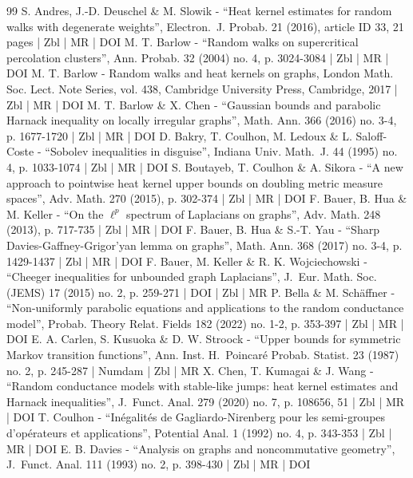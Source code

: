 \begin{thebibliography}{99}
S. Andres, J.-D. Deuschel \& M. Slowik - “Heat kernel estimates for random walks with degenerate weights”, Electron. J. Probab. 21 (2016), article ID 33, 21 pages | Zbl | MR | DOI
M. T. Barlow - “Random walks on supercritical percolation clusters”, Ann. Probab. 32 (2004) no. 4, p. 3024-3084 | Zbl | MR | DOI
M. T. Barlow - Random walks and heat kernels on graphs, London Math. Soc. Lect. Note Series, vol. 438, Cambridge University Press, Cambridge, 2017 | Zbl | MR | DOI
M. T. Barlow \& X. Chen - “Gaussian bounds and parabolic Harnack inequality on locally irregular graphs”, Math. Ann. 366 (2016) no. 3-4, p. 1677-1720 | Zbl | MR | DOI
D. Bakry, T. Coulhon, M. Ledoux \& L. Saloff-Coste - “Sobolev inequalities in disguise”, Indiana Univ. Math. J. 44 (1995) no. 4, p. 1033-1074 | Zbl | MR | DOI
S. Boutayeb, T. Coulhon \& A. Sikora - “A new approach to pointwise heat kernel upper bounds on doubling metric measure spaces”, Adv. Math. 270 (2015), p. 302-374 | Zbl | MR | DOI
F. Bauer, B. Hua \& M. Keller - “On the $\ell ^p$ spectrum of Laplacians on graphs”, Adv. Math. 248 (2013), p. 717-735 | Zbl | MR | DOI
F. Bauer, B. Hua \& S.-T. Yau - “Sharp Davies-Gaffney-Grigor’yan lemma on graphs”, Math. Ann. 368 (2017) no. 3-4, p. 1429-1437 | Zbl | MR | DOI
F. Bauer, M. Keller \& R. K. Wojciechowski - “Cheeger inequalities for unbounded graph Laplacians”, J. Eur. Math. Soc. (JEMS) 17 (2015) no. 2, p. 259-271 | DOI | Zbl | MR
P. Bella \& M. Schäffner - “Non-uniformly parabolic equations and applications to the random conductance model”, Probab. Theory Relat. Fields 182 (2022) no. 1-2, p. 353-397 | Zbl | MR | DOI
E. A. Carlen, S. Kusuoka \& D. W. Stroock - “Upper bounds for symmetric Markov transition functions”, Ann. Inst. H. Poincaré Probab. Statist. 23 (1987) no. 2, p. 245-287 | Numdam | Zbl | MR
X. Chen, T. Kumagai \& J. Wang - “Random conductance models with stable-like jumps: heat kernel estimates and Harnack inequalities”, J. Funct. Anal. 279 (2020) no. 7, p. 108656, 51 | Zbl | MR | DOI
T. Coulhon - “Inégalités de Gagliardo-Nirenberg pour les semi-groupes d’opérateurs et applications”, Potential Anal. 1 (1992) no. 4, p. 343-353 | Zbl | MR | DOI
E. B. Davies - “Analysis on graphs and noncommutative geometry”, J. Funct. Anal. 111 (1993) no. 2, p. 398-430 | Zbl | MR | DOI

\end{thebibliography}
